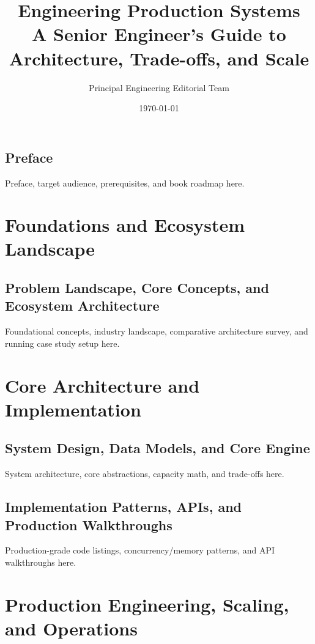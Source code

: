 \documentclass[11pt,oneside]{book}
\title{\textbf{Engineering Production Systems}\\[0.5em]\large A Senior Engineer's Guide to Architecture, Trade-offs, and Scale}
\author{Principal Engineering Editorial Team}
\date{\today}
\begin{document}
\frontmatter
\maketitle
\tableofcontents

\chapter*{Preface}
Preface, target audience, prerequisites, and book roadmap here.

\mainmatter

\part{Foundations and Ecosystem Landscape}

\chapter{Problem Landscape, Core Concepts, and Ecosystem Architecture}
\label{ch:foundations}
Foundational concepts, industry landscape, comparative architecture survey, and running case study setup here.

\part{Core Architecture and Implementation}

\chapter{System Design, Data Models, and Core Engine}
\label{ch:core_architecture}
System architecture, core abstractions, capacity math, and trade-offs here.

\chapter{Implementation Patterns, APIs, and Production Walkthroughs}
\label{ch:implementation}
Production-grade code listings, concurrency/memory patterns, and API walkthroughs here.

\part{Production Engineering, Scaling, and Operations}
\end{document}
